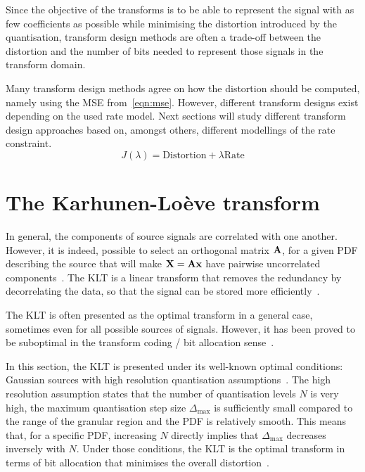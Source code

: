 \documentclass[11pt,a4paper,openright,twoside]{book}
\numberwithin{equation}{section} %
\begin{document}
Since the objective of the transforms is to be able to represent the
signal with as few coefficients as possible while minimising the
distortion introduced by the quantisation, transform design methods are
often a trade-off between the distortion and the number of bits needed
to represent those signals in the transform domain.

Many transform design methods agree on how the distortion should be
computed, namely using the \ac{MSE} from~\eqref{eqn:mse}.
However, different transform designs exist depending on the used rate
model.
Next sections will study different transform design approaches based on,
amongst others, different modellings of the rate constraint.
\begin{equation}
	J(\lambda) = \text{Distortion} + \lambda \text{Rate}
	\label{eqn:transform_design}
\end{equation}

\section{The Karhunen-Loève transform}
\label{sec:the_karhunen_loeve_transform}
In general, the components of source signals are correlated with one
another.
However, it is indeed, possible to select an orthogonal matrix $\mathbf{A}$, for
a given \ac{PDF} describing the source that will make $\mathbf{X}=\mathbf{A}\mathbf{x}$ have
pairwise uncorrelated components~\cite{gersho-92-vector-quantization}.
The \ac{KLT} is a linear transform that removes the redundancy by
decorrelating the data, so that the signal can be stored more
efficiently~\cite{rao-01-transform-data-compression-book}.

The \ac{KLT} is often presented as the optimal transform in a general
case, sometimes even for all possible sources of signals.
However, it has been proved to be suboptimal in the transform coding /
bit allocation sense~\cite{effros-04-suboptimal-klt}.

In this section, the \ac{KLT} is presented under its well-known optimal
conditions: Gaussian sources with high resolution quantisation
assumptions~\cite{goyal-00-high-resolution}.
The high resolution assumption states that the number of quantisation
levels $N$ is very high, the maximum quantisation step size
$\Delta_{\max}$ is sufficiently small compared to the range of the
granular region and the \ac{PDF} is relatively smooth.
This means that, for a specific \ac{PDF}, increasing $N$ directly
implies that $\Delta_{\max}$ decreases inversely with $N$.
Under those conditions, the \ac{KLT} is the optimal transform in terms
of bit allocation that minimises the overall
distortion~\cite{gersho-92-vector-quantization}.
\end{document}
